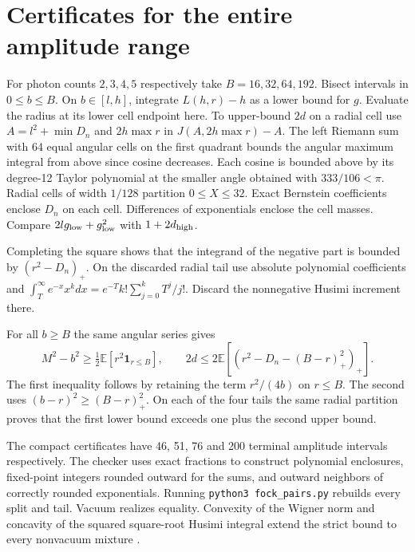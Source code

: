 \documentclass[11pt]{article}
\begin{document}
\section{Certificates for the entire amplitude range}
For photon counts $2,3,4,5$ respectively take $B=16,32,64,192$. Bisect intervals in $0\le b\le B$. On $b\in[l,h]$, integrate $L(h,r)-h$ as a lower bound for $g$. Evaluate the radius at its lower cell endpoint here. To upper-bound $2d$ on a radial cell use $A=l^2+\min D_n$ and $2h\max r$ in $J(A,2h\max r)-A$. The left Riemann sum with 64 equal angular cells on the first quadrant bounds the angular maximum integral from above since cosine decreases. Each cosine is bounded above by its degree-12 Taylor polynomial at the smaller angle obtained with $333/106<\pi$. Radial cells of width $1/128$ partition $0\le X\le32$. Exact Bernstein coefficients enclose $D_n$ on each cell. Differences of exponentials enclose the cell masses. Compare $2lg_{\rm low}+g_{\rm low}^2$ with $1+2d_{\rm high}$.

Completing the square shows that the integrand of the negative part is bounded by $(r^2-D_n)_+$. On the discarded radial tail use absolute polynomial coefficients and $\int_T^\infty e^{-x}x^k dx=e^{-T}k!\sum_{j=0}^k T^j/j!$. Discard the nonnegative Husimi increment there.

For all $b\ge B$ the same angular series gives
\[
 M^2-b^2\ge\tfrac12\mathbb E[r^2\mathbf 1_{r\le B}],\qquad
 2d\le2\mathbb E\!\left[(r^2-D_n-(B-r)_+^2)_+\right].
\]
The first inequality follows by retaining the term $r^2/(4b)$ on $r\le B$. The second uses $(b-r)^2\ge(B-r)_+^2$. On each of the four tails the same radial partition proves that the first lower bound exceeds one plus the second upper bound.

The compact certificates have 46, 51, 76 and 200 terminal amplitude intervals respectively. The checker uses exact fractions to construct polynomial enclosures, fixed-point integers rounded outward for the sums, and outward neighbors of correctly rounded exponentials. Running \texttt{python3 fock\_pairs.py} rebuilds every split and tail. Vacuum realizes equality. Convexity of the Wigner norm and concavity of the squared square-root Husimi integral extend the strict bound to every nonvacuum mixture \cite{gag}.

\newpage
\end{document}

